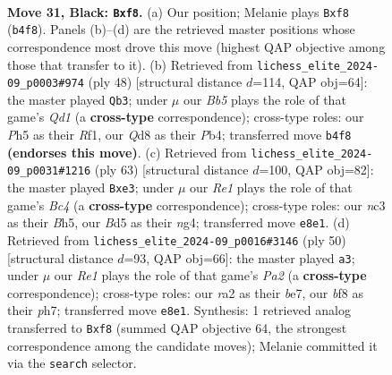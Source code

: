 \documentclass[11pt]{article}
\begin{document}
\clearpage

\begin{figure}[p]\centering
\begin{subfigure}{0.46\textwidth}\centering
\resizebox{\linewidth}{!}{%
\newchessgame
\chessboard[
  setfen={r2qrB2/ppp4k/5pp1/3b3p/Pb6/2N3P1/RPPQ1P1P/6K1 b - - 1 31},
  showmover=false,
  pgfstyle=straightmove, color=movearrow, markmove={b4-f8}
]}
\caption{}
\end{subfigure}\hfill
\begin{subfigure}{0.46\textwidth}\centering
\resizebox{\linewidth}{!}{%
\newchessgame
\chessboard[
  setfen={1r6/p2rnpk1/6p1/1pRBp1qp/1P2P3/8/P4PPP/3Q1R1K w - - 0 25},
  showmover=false,
  pgfstyle=straightmove, color=movearrow, markmove={d1-b3}
]}
\caption{}
\end{subfigure}
\\[4pt]
\begin{subfigure}{0.46\textwidth}\centering
\resizebox{\linewidth}{!}{%
\newchessgame
\chessboard[
  setfen={2q1r3/5p1k/2p2Pp1/r1b3Pb/1p2p1NQ/1P2B2P/P5RK/3R4 b - - 2 32},
  showmover=false,
  pgfstyle=straightmove, color=movearrow, markmove={c5-e3}
]}
\caption{}
\end{subfigure}\hfill
\begin{subfigure}{0.46\textwidth}\centering
\resizebox{\linewidth}{!}{%
\newchessgame
\chessboard[
  setfen={4rk2/4bppp/p2p4/q1p5/1nP5/3B4/PP1BR1PP/1Q5K w - - 2 26},
  showmover=false,
  pgfstyle=straightmove, color=movearrow, markmove={a2-a3}
]}
\caption{}
\end{subfigure}
\caption{\textbf{Move 31, Black: \texttt{Bxf8}.} (a) Our position; Melanie plays \texttt{Bxf8} (\texttt{b4f8}). Panels (b)--(d) are the retrieved master positions whose correspondence most drove this move (highest QAP objective among those that transfer to it). (b) Retrieved from \texttt{lichess\_elite\_2024-09\_p0003\#974} (ply 48) [structural distance $d$=114, QAP obj=64]: the master played \texttt{Qb3}; under $\mu$ our \emph{Bb5} plays the role of that game's \emph{Qd1} (a \textbf{cross-type} correspondence); cross-type roles: our \emph{P}h5 as their \emph{R}f1, our \emph{Q}d8 as their \emph{P}b4; transferred move \texttt{b4f8} \textbf{(endorses this move)}. (c) Retrieved from \texttt{lichess\_elite\_2024-09\_p0031\#1216} (ply 63) [structural distance $d$=100, QAP obj=82]: the master played \texttt{Bxe3}; under $\mu$ our \emph{Re1} plays the role of that game's \emph{Bc4} (a \textbf{cross-type} correspondence); cross-type roles: our \emph{n}c3 as their \emph{B}h5, our \emph{B}d5 as their \emph{n}g4; transferred move \texttt{e8e1}. (d) Retrieved from \texttt{lichess\_elite\_2024-09\_p0016\#3146} (ply 50) [structural distance $d$=93, QAP obj=66]: the master played \texttt{a3}; under $\mu$ our \emph{Re1} plays the role of that game's \emph{Pa2} (a \textbf{cross-type} correspondence); cross-type roles: our \emph{r}a2 as their \emph{b}e7, our \emph{b}f8 as their \emph{p}h7; transferred move \texttt{e8e1}. Synthesis: 1 retrieved analog transferred to \texttt{Bxf8} (summed QAP objective 64, the strongest correspondence among the candidate moves); Melanie committed it via the \texttt{search} selector.}
\label{fig:thought-m61}
\end{figure}
\end{document}
